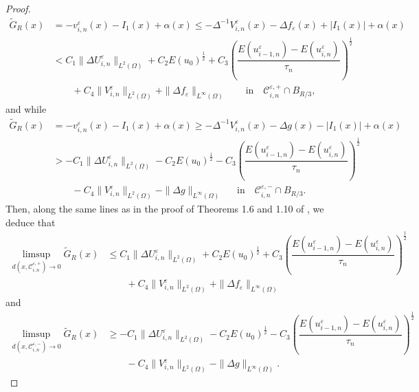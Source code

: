 \documentclass[12pt]{amsart}
\begin{document}
\begin{proof}
\begin{align*}
\tilde{G}_{R}(x) &= -v^{\varepsilon}_{i,n}(x) -I_1(x) + {\alpha}(x) 
 \le -\Delta^{-1}V^{\varepsilon}_{i,n}(x) - \Delta f_{\varepsilon}(x) + {\left| {I_1(x)} \right|} + {\alpha}(x) \\
& <  C_1 \| \Delta U^{\varepsilon}_{i,n} \|_{L^2(\Omega)} 
     + C_2 E(u_0)^{\frac{1}{2}} + C_3 \left( \dfrac{E(u^{\varepsilon}_{i-1,n}) - E(u^{\varepsilon}_{i,n})}{\tau_n} \right)^{\frac{1}{2}}  \\
& \qquad   + C_4 \| V^{\varepsilon}_{i,n} \|_{L^2(\Omega)} + \| \Delta f_{\varepsilon} \|_{L^\infty(\Omega)} 
\qquad \text{in} \quad {\mathcal{C}}^{{\varepsilon},+}_{i,n} \cap B_{R/3},  
\end{align*}
and while 
\begin{align*}
\tilde{G}_{R}(x) &= -v^{\varepsilon}_{i,n}(x) - I_1(x) + {\alpha}(x) 
 \ge -\Delta^{-1}V^{\varepsilon}_{i,n}(x) - \Delta g(x) -{\left| {I_1(x)} \right|} + {\alpha}(x) \\
& > - C_1 \| \Delta U^{\varepsilon}_{i,n} \|_{L^2(\Omega)} 
    - C_2 E(u_0)^{\frac{1}{2}} - C_3 \left( \dfrac{E(u^{\varepsilon}_{i-1,n}) - E(u^{\varepsilon}_{i,n})}{\tau_n} \right)^{\frac{1}{2}}  \\
& \qquad - C_4 \| V^{\varepsilon}_{i,n} \|_{L^2(\Omega)} - \| \Delta g \|_{L^\infty(\Omega)}
 \quad\,\,\, \text{in} \quad {\mathcal{C}}^{{\varepsilon},-}_{i,n} \cap B_{R/3}. 
\end{align*}
Then, along the same lines as in the proof of Theorems 1.6 and 1.10 of \cite{La}, we deduce that 
\begin{align*}
\limsup_{d(x, {\mathcal{C}}^{{\varepsilon},+}_{i,n}) \to 0} \tilde{G}_{R}(x) 
& \le C_1 \| \Delta U^{\varepsilon}_{i,n} \|_{L^2(\Omega)} 
   + C_2 E(u_0)^{\frac{1}{2}} + C_3 \left( \dfrac{E(u^{\varepsilon}_{i-1,n}) - E(u^{\varepsilon}_{i,n})}{\tau_n} \right)^{\frac{1}{2}} \\
& \qquad + C_4 \| V^{\varepsilon}_{i,n} \|_{L^2(\Omega)} + \| \Delta f_{\varepsilon} \|_{L^\infty(\Omega)} 
\end{align*}
and 
\begin{align*} 
\limsup_{d(x, {\mathcal{C}}^{{\varepsilon},-}_{i,n}) \to 0} \tilde{G}_{R}(x) 
& \ge - C_1 \| \Delta U^{\varepsilon}_{i,n} \|_{L^2(\Omega)} 
    - C_2 E(u_0)^{\frac{1}{2}} - C_3 \left( \dfrac{E(u^{\varepsilon}_{i-1,n}) - E(u^{\varepsilon}_{i,n})}{\tau_n} \right)^{\frac{1}{2}} \\ 
& \qquad - C_4 \| V^{\varepsilon}_{i,n} \|_{L^2(\Omega)} - \| \Delta g \|_{L^\infty(\Omega)}. 
\end{align*}

\end{proof}
\end{document}
